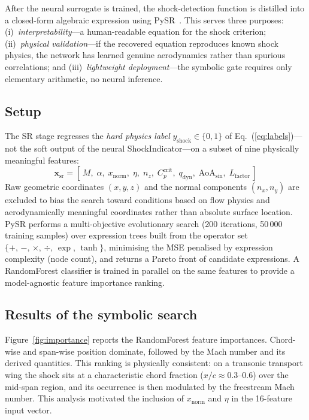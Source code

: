 \documentclass{WCCM-ECCOMAS_2026_Full_Paper}
\begin{document}
After the neural surrogate is trained, the shock-detection function
is distilled into a closed-form algebraic expression using
PySR~\cite{Cranmer2020}.  This serves three purposes:
(i)~\emph{interpretability}---a human-readable equation for the shock
criterion; (ii)~\emph{physical validation}---if the recovered
equation reproduces known shock physics, the network has learned
genuine aerodynamics rather than spurious correlations; and
(iii)~\emph{lightweight deployment}---the symbolic gate requires only
elementary arithmetic, no neural inference.

\subsection{Setup}

The SR stage regresses the \emph{hard physics label}
$y_{\mathrm{shock}}\in\{0,1\}$ of Eq.~(\ref{eq:labels})---not the
soft output of the neural ShockIndicator---on a subset of nine
physically meaningful features:
\begin{equation}
  \mathbf{x}_{\mathrm{sr}} = [\,M,\;\alpha,\;x_{\mathrm{norm}},\;
  \eta,\; n_{z},\; C_{p}^{\mathrm{crit}},\; q_{\mathrm{dyn}},\;
  \mathrm{AoA}_{\sin},\; L_{\mathrm{factor}}\,]
  \label{eq:srfeatures}
\end{equation}
Raw geometric coordinates $(x,y,z)$ and the normal components
$(n_x,n_y)$ are excluded to bias the search toward conditions based
on flow physics and aerodynamically meaningful coordinates rather
than absolute surface location.  PySR performs a multi-objective
evolutionary search (200 iterations, 50\,000 training samples) over
expression trees built from the operator set
$\{+,\,-,\,\times,\,\div,\,\exp,\,\tanh\}$, minimising the MSE
penalised by expression complexity (node count), and returns a Pareto
front of candidate expressions.  A RandomForest classifier is trained
in parallel on the same features to provide a model-agnostic feature
importance ranking.

\subsection{Results of the symbolic search}
\label{sec:srresults}

Figure~\ref{fig:importance} reports the RandomForest feature
importances.  Chord-wise and span-wise position dominate, followed by
the Mach number and its derived quantities.  This ranking is
physically consistent: on a transonic transport wing the shock sits
at a characteristic chord fraction ($x/c \approx 0.3$--$0.6$) over
the mid-span region, and its occurrence is then modulated by the
freestream Mach number.  This analysis motivated the inclusion of
$x_{\mathrm{norm}}$ and $\eta$ in the 16-feature input vector.
\end{document}
